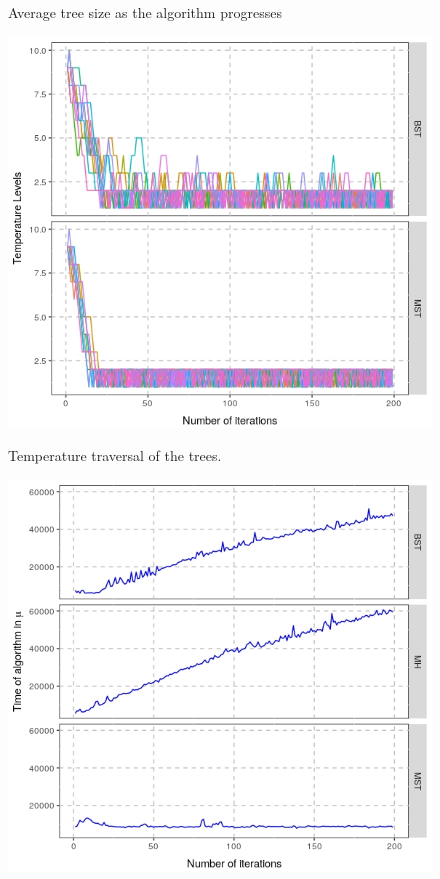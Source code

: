 \documentclass[a1paper,portrait, fontscale=0.45]{baposter}
\begin{document}
\begin{poster}
{\begin{multicols}{3}
\begin{figure}[H]
\begin{minipage}[c]{0.6\linewidth}
\label{fig:compsize}
\vspace{-1.7em}
\caption{Average tree size as the algorithm progresses}
\end{minipage}
\end{figure}
\begin{figure}[H]
\hspace{1em}
\begin{minipage}[c]{0.6\linewidth}
\includegraphics[width=\linewidth]{comp2levels.jpeg}
\label{fig:compsimtem}
\vspace{-1.7em}
\caption{Temperature traversal of the trees.}
\end{minipage}
\end{figure}
\begin{figure}[H]
\hspace{1em}
\begin{minipage}[c]{0.6\linewidth}
\includegraphics[width=\linewidth]{comp3times.jpeg}

\end{minipage}
\end{figure}
\end{multicols}}
\end{poster}
\end{document}
